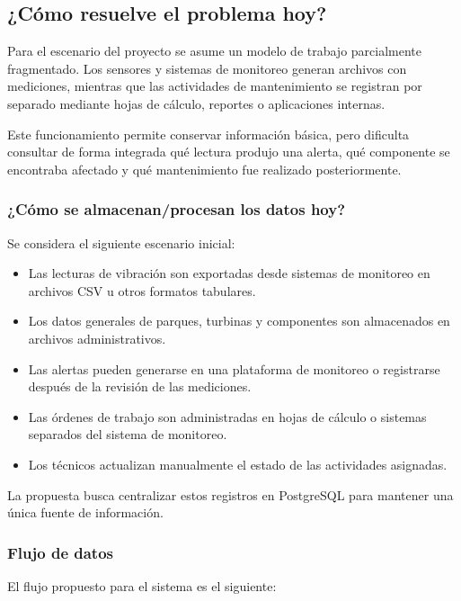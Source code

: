 \documentclass[11pt,a4paper]{article}
\begin{document}
\subsection{¿Cómo resuelve el problema hoy?}

Para el escenario del proyecto se asume un modelo de trabajo parcialmente
fragmentado. Los sensores y sistemas de monitoreo generan archivos con mediciones,
mientras que las actividades de mantenimiento se registran por separado mediante
hojas de cálculo, reportes o aplicaciones internas.

Este funcionamiento permite conservar información básica, pero dificulta consultar
de forma integrada qué lectura produjo una alerta, qué componente se encontraba
afectado y qué mantenimiento fue realizado posteriormente.

\subsubsection{¿Cómo se almacenan/procesan los datos hoy?}

Se considera el siguiente escenario inicial:

\begin{itemize}
    \item Las lecturas de vibración son exportadas desde sistemas de monitoreo en
    archivos CSV u otros formatos tabulares.
    \item Los datos generales de parques, turbinas y componentes son almacenados en
    archivos administrativos.
    \item Las alertas pueden generarse en una plataforma de monitoreo o registrarse
    después de la revisión de las mediciones.
    \item Las órdenes de trabajo son administradas en hojas de cálculo o sistemas
    separados del sistema de monitoreo.
    \item Los técnicos actualizan manualmente el estado de las actividades asignadas.
\end{itemize}

La propuesta busca centralizar estos registros en PostgreSQL para mantener una única
fuente de información.

\subsubsection{Flujo de datos}

El flujo propuesto para el sistema es el siguiente:
\end{document}
